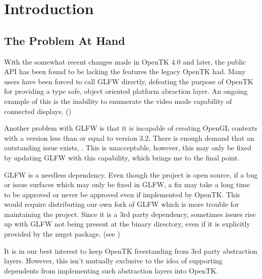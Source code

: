 \section{Introduction}

\subsection{The Problem At Hand}
With the somewhat recent changes made in OpenTK 4.0 and later, the public API
has been found to be lacking the features the legacy OpenTK had. Many users have
been forced to call GLFW directly, defeating the purpose of OpenTK for providing
a type safe, object oriented platform abraction layer. An ongoing example of
this is the inability to enumerate the video mode capability of connected
displays. () 

Another problem with GLFW is that it is incapable of creating OpenGL contexts
with a version less than or equal to version 3.2. There is enough demand that
an outstanding issue exists, . This is unacceptable, however,
this may only be fixed by updating GLFW with this capability, which brings me to
the final point.

GLFW is a needless dependency. Even though the project is open source, if a bug
or issue surfaces which may only be fixed in GLFW, a fix may take a long time to
be approved or never be approved even if implemented by OpenTK. This would
require distributing our own fork of GLFW which is more trouble for maintaining
the project. Since it is a 3rd party dependency, sometimes issues rise up with
GLFW not being present at the binary directory, even if it is explicitly
provided by the nuget package. (see )

It is in our best interest to keep OpenTK freestanding from 3rd party
abstraction layers. However, this isn't mutually exclusive to the idea of
supporting dependents from implementing such abstraction layers into OpenTK.
